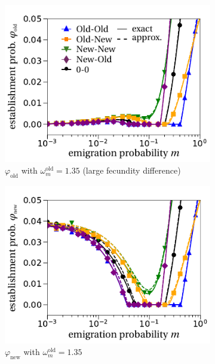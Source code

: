 \documentclass[11pt]{article}
\begin{document}
\begin{figure}[t!]
	\centering
	\begin{subfigure}{.5\textwidth}
  		\centering
  		\includegraphics[width=\linewidth]{fig2a.pdf}
  		\caption{$\varphi_{\text{old}}$ with $\omega^\text{old}_m = 1.35$ (large fecundity difference)}
	\end{subfigure}%
	\begin{subfigure}{.5\textwidth}
 		 \centering
 		 \includegraphics[width=\linewidth]{fig2b.pdf}
  		\caption{$\varphi_{\text{new}}$ with $\omega^\text{old}_m = 1.35$}
	\end{subfigure}
	\begin{subfigure}{.5\textwidth}
  		\centering

\end{subfigure}
\end{figure}
\end{document}
